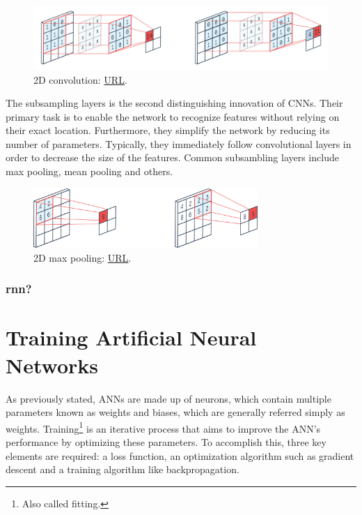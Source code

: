 \begin{figure}[H]
    \centering
        \includegraphics[width=1\textwidth]{Images/2d_convolution.png}
        \decoRule
        \caption[2D convolution]{2D convolution: \href{https://peltarion.com/knowledge-center/documentation/modeling-view/build-an-ai-model/blocks/2d-convolution}{URL}.}
        \label{fig:2D convolution}
\end{figure}

The subsampling layers is the second distinguishing innovation of CNNs. Their primary task is to enable the network to recognize features without relying on their exact location. Furthermore, they simplify the network by reducing its number of parameters. Typically, they immediately follow convolutional layers in order to decrease the size of the features. Common subsambling layers include max pooling, mean pooling and others.

\begin{figure}[H]
    \centering
        \includegraphics[width=0.76\textwidth]{Images/2d_max_pooling.png}
        \decoRule
        \caption[2D max pooling]{2D max pooling: \href{https://peltarion.com/knowledge-center/documentation/modeling-view/build-an-ai-model/blocks/max-pooling-2d}{URL}.}
        \label{fig:2D max pooling}
\end{figure}

\subsubsection{rnn?}

\section{Training Artificial Neural Networks}
As previously stated, ANNs are made up of neurons, which contain multiple parameters known as weights and biases, which are generally referred simply as weights. Training\footnote{Also called fitting.} is an iterative process that aims to improve the ANN's performance by optimizing these parameters. To accomplish this, three key elements are required: a loss function, an optimization algorithm such as gradient descent and a training algorithm like backpropagation.

